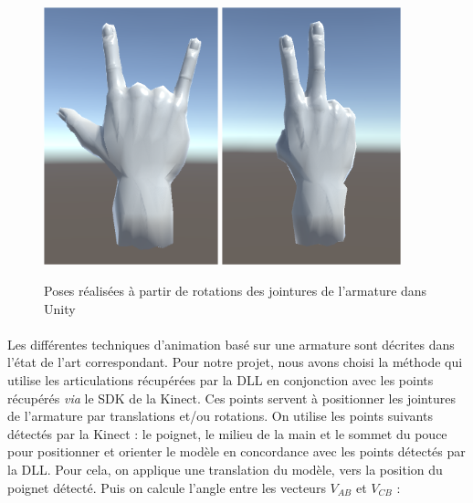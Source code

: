 \begin{figure}[!h]
	\centering
	\includegraphics[width=0.45\textwidth]{images/HandPose1.png}
	\includegraphics[width=0.46\textwidth]{images/HandPose2.png}
	\caption{Poses réalisées à partir de rotations des jointures de l'armature dans Unity}
\end{figure}

\paragraph{}
Les différentes techniques d'animation basé sur une armature sont décrites dans l'état de l'art correspondant. 
Pour notre projet, nous avons choisi la méthode qui utilise les articulations récupérées par la DLL en conjonction avec les points récupérés \textit{via} le SDK de la Kinect. 
Ces points servent à positionner les jointures de l'armature par translations et/ou rotations.\newline
On utilise les points suivants détectés par la Kinect : le poignet, le milieu de la main et le sommet du pouce pour positionner et orienter le modèle en concordance avec les points détectés par la DLL.
Pour cela, on applique une translation du modèle, vers la position du poignet détecté. Puis on calcule l'angle entre les vecteurs $V_{AB}$ et $V_{CB}$  : 

